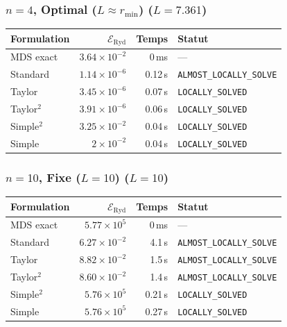 \subsubsection{$n=4$, Optimal ($L{\approx}r_{\min}$) ($L=7.361$)}
\begin{longtable}{@{}lrrl@{}}
  \toprule
  Formulation & $\mathcal{E}_{\mathrm{Ryd}}$ & Temps & Statut \\
  \midrule
  \endhead
  MDS exact & $3.64\times10^{-2}$ & 0\,ms & --- \\
  Standard & $1.14\times10^{-6}$ & 0.12\,s & \texttt{ALMOST\_LOCALLY\_SOLVE} \\
  Taylor & $3.45\times10^{-6}$ & 0.07\,s & \texttt{LOCALLY\_SOLVED} \\
  Taylor$^2$ & $3.91\times10^{-6}$ & 0.06\,s & \texttt{LOCALLY\_SOLVED} \\
  Simple$^2$ & $3.25\times10^{-2}$ & 0.04\,s & \texttt{LOCALLY\_SOLVED} \\
  Simple & $2\times10^{-2}$ & 0.04\,s & \texttt{LOCALLY\_SOLVED} \\
  \bottomrule
\end{longtable}

\subsubsection{$n=10$, Fixe ($L{=}10$) ($L=10$)}
\begin{longtable}{@{}lrrl@{}}
  \toprule
  Formulation & $\mathcal{E}_{\mathrm{Ryd}}$ & Temps & Statut \\
  \midrule
  \endhead
  MDS exact & $5.77\times10^{5}$ & 0\,ms & --- \\
  Standard & $6.27\times10^{-2}$ & 4.1\,s & \texttt{ALMOST\_LOCALLY\_SOLVE} \\
  Taylor & $8.82\times10^{-2}$ & 1.5\,s & \texttt{ALMOST\_LOCALLY\_SOLVE} \\
  Taylor$^2$ & $8.60\times10^{-2}$ & 1.4\,s & \texttt{ALMOST\_LOCALLY\_SOLVE} \\
  Simple$^2$ & $5.76\times10^{5}$ & 0.21\,s & \texttt{LOCALLY\_SOLVED} \\
  Simple & $5.76\times10^{5}$ & 0.27\,s & \texttt{LOCALLY\_SOLVED} \\
  \bottomrule
\end{longtable}

